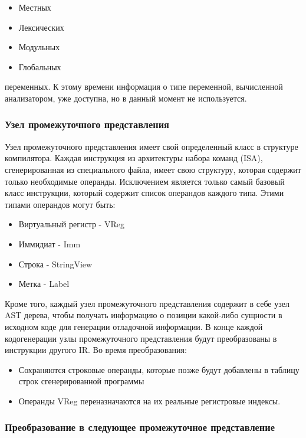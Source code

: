\begin{itemize}[left=2em]
    \item Местных
    \item Лексических
    \item Модульных
    \item Глобальных
\end{itemize}

переменных.
К этому времени информация о типе переменной, вычисленной анализатором, уже доступна, но в данный момент
не используется.

\subsubsection{Узел промежуточного представления}

Узел промежуточного представления имеет свой определенный класс в структуре компилятора.
Каждая инструкция из архитектуры набора команд (ISA), сгенерированная из специального файла, имеет свою структуру,
которая содержит только необходимые операнды.
Исключением является только самый базовый класс инструкции, который содержит список операндов каждого типа.
Этими типами операндов могут быть:

\begin{itemize}[left=2em]
    \item Виртуальный регистр - VReg
    \item Иммидиат - Imm
    \item Строка - StringView
    \item Метка - Label
\end{itemize}

Кроме того, каждый узел промежуточного представления содержит в себе узел AST дерева,
чтобы получать информацию о позиции какой-либо сущности в исходном коде для генерации отладочной информации.
В конце каждой кодогенерации узлы промежуточного представления будут преобразованы в инструкции другого IR.
Во время преобразования:

\begin{itemize}[left=2em]
    \item Сохраняются строковые операнды, которые позже будут добавлены в таблицу строк сгенерированной программы
    \item Операнды VReg переназначаются на их реальные регистровые индексы.
\end{itemize}

\subsubsection{Преобразование в следующее промежуточное представление}

